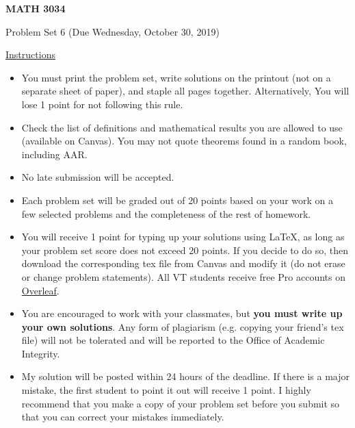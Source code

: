 \documentclass[12pt]{amsart}
\begin{document}

\hfill{}

\vspace{0.3in}
\begin{center}
{\Large{\textbf{MATH 3034}}}

\vspace{0.1in}
{\large{Problem Set 6 (Due Wednesday, October 30, 2019)}}
\end{center}

\vspace{0.3in}
\noindent
\underline{Instructions}
\begin{itemize}
\vspace{0.1in}
\item You must print the problem set, write solutions on the printout (not on a separate sheet of paper), and staple all pages together.  Alternatively,  You will lose 1 point for not following this rule.
\vspace{0.1in}
\item Check the list of definitions and mathematical results you are allowed to use (available on Canvas).  You may not quote theorems found in a random book, including AAR.
\vspace{0.1in}
\item No late submission will be accepted.
\vspace{0.1in}
\item Each problem set will be graded out of 20 points based on your work on a few selected problems and the completeness of the rest of homework.
\vspace{0.1in}
\item You will receive 1 point for typing up your solutions using \LaTeX, as long as your problem set score does not exceed 20 points.  If you decide to do so, then download the corresponding tex file from Canvas and modify it (do not erase or change problem statements).  All VT students receive free Pro accounts on \href{https://www.overleaf.com/edu/vtech}{Overleaf}.
\vspace{0.1in}
\item You are encouraged to work with your classmates, but \textbf{you must write up your own solutions}.  Any form of plagiarism (e.g. copying your friend's tex file) will not be tolerated and will be reported to the Office of Academic Integrity.
\vspace{0.1in}
\item My solution will be posted within 24 hours of the deadline.  If there is a major mistake, the first student to point it out will receive 1 point.  I highly recommend that you make a copy of your problem set before you submit so that you can correct your mistakes immediately.
\end{itemize}
\end{document}
